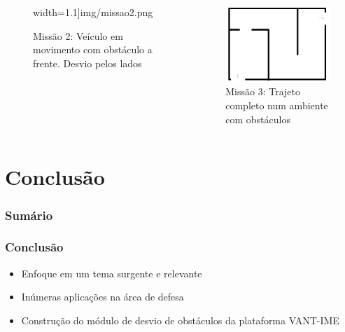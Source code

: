 \documentclass{beamer}
\begin{document}
\begin{frame}
\begin{columns}[T]
\begin{column}[T]{3cm}
\begin{figure}
					width=1.1\textwidth]{img/missao2.png}
					\caption{Missão 2: Veículo em movimento com obstáculo a frente. Desvio pelos lados}
					\label{fig:missao2}
				\end{figure}
			\end{column}
			\begin{column}[T]{3cm} %
				\begin{figure}
					\centering
					\includegraphics[keepaspectratio = true,
					width=1.0\textwidth]{img/missao3.png}
					\caption{Missão 3: Trajeto completo num ambiente com obstáculos}
					\label{fig:missao3}
				\end{figure}
			\end{column}
		\end{columns}
			
			
\end{frame}	


\section{Conclusão}

\begin{frame}
	\frametitle{Sumário}
	\tableofcontents[currentsection]
\end{frame}

\begin{frame}
	
	\frametitle{Conclusão}
	
	\begin{itemize}	
		
		\item  Enfoque em um tema surgente e relevante
		
		\item Inúmeras aplicações na área de defesa
		
		\item Construção do módulo de desvio de obstáculos da plataforma VANT-IME 
		
		
	\end{itemize}	
	
	
\end{frame}	
\end{document}
